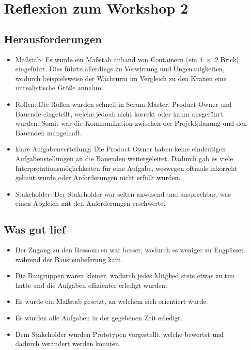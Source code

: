 \documentclass[a4paper, 11pt]{article}
\begin{document}
	\pagebreak
	\setcounter{page}{1}
	\tableofcontents
	
        \pagebreak

\section{Reflexion zum Workshop 2}

\subsection{Herausforderungen}
\begin{itemize}
    \item Maßstab: Es wurde ein Maßstab anhand von Containern (ein 4 × 2 Brick) eingeführt. Dies führte allerdings zu Verwirrung und Ungenauigkeiten, wodurch beispielsweise der Wachturm im Vergleich zu den Kränen eine unrealistische Größe annahm.
    \item Rollen: Die Rollen wurden schnell in Scrum Master, Product Owner und Bauende eingeteilt, welche jedoch nicht korrekt oder kaum ausgeführt wurden. Somit war die Kommunikation zwischen der Projektplanung und den Bauenden mangelhaft.
    \item klare Aufgabenverteilung: Die Product Owner haben keine eindeutigen Aufgabenstellungen an die Bauenden weitergeleitet. Dadurch gab es viele Interpretationsmöglichkeiten für eine Aufgabe, weswegen oftmals inkorrekt gebaut wurde oder Anforderungen nicht erfüllt wurden.
    \item Stakeholder: Der Stakeholder war selten anwesend und ansprechbar, was einen Abgleich mit den Anforderungen erschwerte.
\end{itemize}

\subsection{Was gut lief}
\begin{itemize}
    \item Der Zugang zu den Ressourcen war besser, wodurch es weniger zu Engpässen während der Bausteinlieferung kam.
    \item Die Baugruppen waren kleiner, wodurch jedes Mitglied stets etwas zu tun hatte und die Aufgaben effizienter erledigt wurden.
    \item Es wurde ein Maßstab gesetzt, an welchem sich orientiert wurde.
    \item Es wurden alle Aufgaben in der gegebenen Zeit erledigt.
    \item Dem Stakeholder wurden Prototypen vorgestellt, welche bewertet und dadurch verändert werden konnten.
\end{itemize}
\end{document}
